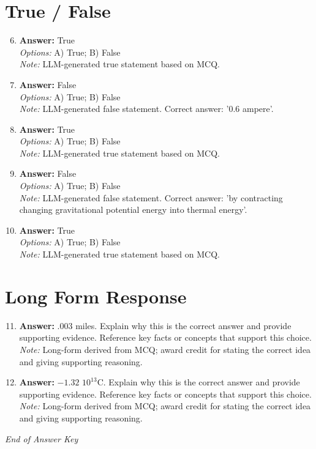 \documentclass[12pt]{article}
\begin{document}
\section*{True / False}
\begin{enumerate}[label=\arabic*.]
\setcounter{enumi}{5}
\item \textbf{Answer:} True
\\ \textit{Options:} A) True; B) False
\\ \textit{Note:} LLM-generated true statement based on MCQ.
\item \textbf{Answer:} False
\\ \textit{Options:} A) True; B) False
\\ \textit{Note:} LLM-generated false statement. Correct answer: '0.6 ampere'.
\item \textbf{Answer:} True
\\ \textit{Options:} A) True; B) False
\\ \textit{Note:} LLM-generated true statement based on MCQ.
\item \textbf{Answer:} False
\\ \textit{Options:} A) True; B) False
\\ \textit{Note:} LLM-generated false statement. Correct answer: 'by contracting changing gravitational potential energy into thermal energy'.
\item \textbf{Answer:} True
\\ \textit{Options:} A) True; B) False
\\ \textit{Note:} LLM-generated true statement based on MCQ.
\end{enumerate}

\section*{Long Form Response}
\begin{enumerate}[label=\arabic*.]
\setcounter{enumi}{10}
\item \textbf{Answer:} .003 miles. Explain why this is the correct answer and provide supporting evidence. Reference key facts or concepts that support this choice.
\\ \textit{Note:} Long-form derived from MCQ; award credit for stating the correct idea and giving supporting reasoning.
\item \textbf{Answer:} $-1.32$ $10^{13} \mathrm{C}$. Explain why this is the correct answer and provide supporting evidence. Reference key facts or concepts that support this choice.
\\ \textit{Note:} Long-form derived from MCQ; award credit for stating the correct idea and giving supporting reasoning.
\end{enumerate}

\vfill
\noindent\textit{End of Answer Key}
\end{document}
